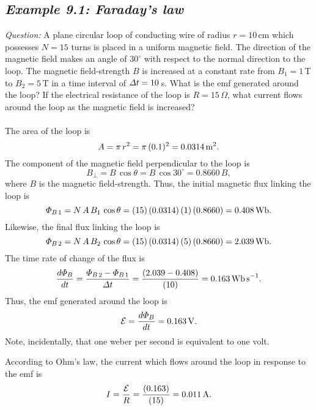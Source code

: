 \subsection*{\em Example 9.1: Faraday's law}
{\em Question:} A plane circular loop of conducting wire of radius $r=10$\,cm which
possesses $N=15$ turns is placed in a uniform magnetic field. The direction
of the magnetic field makes an angle of $30^\circ$ with respect to the normal
direction to the loop. 
The magnetic field-strength $B$ is increased at a constant
rate from $B_1=1$\,T to $B_2=5$\,T in a time interval of ${\mit\Delta}t=10$\,s. What
is the emf generated around the loop? If the electrical resistance of the
loop is $R=15\,\Omega$, what current flows around the loop as the
magnetic field is increased? \\
~\\
 The area of the loop is 
$$
A = \pi\,r^2 = \pi\,(0.1)^2 = 0.0314\,{\rm m}^2.
$$
The component of the magnetic field perpendicular to the loop is
$$
B_\perp = B\,\cos\theta = B\,\cos 30^\circ = 0.8660\,B,
$$
where $B$ is the magnetic field-strength. Thus, the initial magnetic
flux linking the loop is
$$
{\mit\Phi}_{B\,1} = N\,A\,B_1\,\cos\theta = (15)\,(0.0314)\,(1)\,(0.8660) = 0.408\,{\rm Wb}.
$$
Likewise, the final flux linking the loop is
$$
{\mit\Phi}_{B\,2} = N\,A\,B_2\,\cos\theta = 
(15)\,(0.0314)\,(5)\,(0.8660) = 2.039\,{\rm Wb}.
$$
The time rate of change of the flux is
$$
\frac{d{\mit\Phi}_B}{dt} = \frac{{\mit\Phi}_{B\,2}- 
{\mit\Phi}_{B\,1}}{{\mit\Delta}t} = \frac{(2.039-0.408)}{(10)}=0.163\,{\rm Wb\,s}^{-1}.
$$
Thus, the emf generated around the loop is
$$
{\cal E} = \frac{d{\mit\Phi}_B}{dt} = 0.163\,{\rm V}.
$$
Note, incidentally, that one weber per second is equivalent to one volt. 

According to Ohm's law, the current which flows around the loop in response to the
emf is
$$
I = \frac{{\cal E}}{R} = \frac{(0.163)}{(15)} = 0.011\,{\rm A}.
$$


